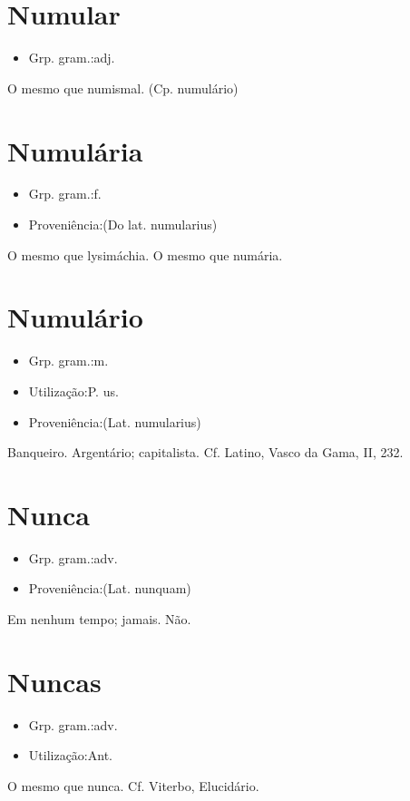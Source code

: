 \section{Numular}
\begin{itemize}
\item {Grp. gram.:adj.}
\end{itemize}
O mesmo que \textunderscore numismal\textunderscore .
(Cp. \textunderscore numulário\textunderscore )
\section{Numulária}
\begin{itemize}
\item {Grp. gram.:f.}
\end{itemize}
\begin{itemize}
\item {Proveniência:(Do lat. \textunderscore numularius\textunderscore )}
\end{itemize}
O mesmo que \textunderscore lysimáchia\textunderscore .
O mesmo que \textunderscore numária\textunderscore .
\section{Numulário}
\begin{itemize}
\item {Grp. gram.:m.}
\end{itemize}
\begin{itemize}
\item {Utilização:P. us.}
\end{itemize}
\begin{itemize}
\item {Proveniência:(Lat. \textunderscore numularius\textunderscore )}
\end{itemize}
Banqueiro.
Argentário; capitalista. Cf. Latino, \textunderscore Vasco da Gama\textunderscore , II, 232.
\section{Nunca}
\begin{itemize}
\item {Grp. gram.:adv.}
\end{itemize}
\begin{itemize}
\item {Proveniência:(Lat. \textunderscore nunquam\textunderscore )}
\end{itemize}
Em nenhum tempo; jamais.
Não.
\section{Nuncas}
\begin{itemize}
\item {Grp. gram.:adv.}
\end{itemize}
\begin{itemize}
\item {Utilização:Ant.}
\end{itemize}
O mesmo que \textunderscore nunca\textunderscore . Cf. Viterbo, \textunderscore Elucidário\textunderscore .
